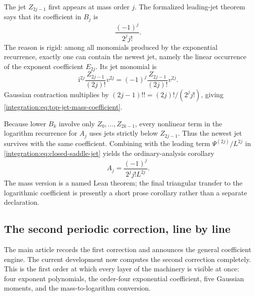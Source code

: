 \documentclass[11pt,oneside]{article}
\theoremstyle{definition}
\theoremstyle{remark}
\newcommand{\ii}{\mathrm i}
\begin{document}
The jet $Z_{2j-1}$ first appears at mass order $j$.  The formalized leading-jet theorem says
that its coefficient in $B_j$ is
\begin{equation}
 \frac{(-1)^j}{2^jj!}.
 \label{integration:eq:top-jet-mass-coefficient}
\end{equation}
The reason is rigid: among all monomials produced by the exponential recurrence, exactly one
can contain the newest jet, namely the linear occurrence of the exponent coefficient
$E_{2j}$.  Its jet monomial is
\begin{equation}
 \ii^{2j}\frac{Z_{2j-1}}{(2j)!}v^{2j}
 =(-1)^j\frac{Z_{2j-1}}{(2j)!}v^{2j}.
 \label{integration:eq:top-jet-monomial}
\end{equation}
Gaussian contraction multiplies by $(2j-1)!!=(2j)!/(2^jj!)$, giving
\eqref{integration:eq:top-jet-mass-coefficient}.

Because lower $B_k$ involve only $Z_0,\ldots,Z_{2k-1}$, every nonlinear term in the logarithm
recurrence for $A_j$ uses jets strictly below $Z_{2j-1}$.  Thus the newest jet survives with
the same coefficient.  Combining with the leading term
$\Psi^{(2j)}/L^{2j}$ in \eqref{integration:eq:closed-saddle-jet} yields the ordinary-analysis
corollary
\begin{equation}
 [\Psi^{(2j)}]A_j
 =\frac{(-1)^j}{2^jj!L^{2j}}.
 \label{integration:eq:top-periodic-derivative-coefficient}
\end{equation}
The mass version is a named Lean theorem; the final triangular transfer to the logarithmic
coefficient is presently a short prose corollary rather than a separate declaration.

\subsection{The second periodic correction, line by line}
\label{integration:sec:second-correction}

The main article records the first correction and announces the general coefficient engine.
The current development now computes the second correction completely.  This is the first
order at which every layer of the machinery is visible at once: four exponent polynomials,
the order-four exponential coefficient, five Gaussian moments, and the mass-to-logarithm
conversion.
\end{document}

